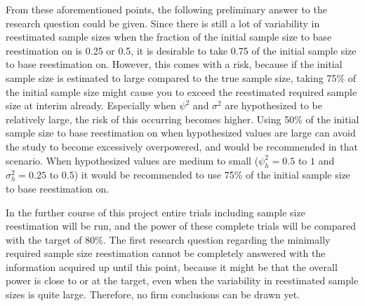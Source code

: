 \documentclass[11pt]{article}
\begin{document}
From these aforementioned points, the following preliminary answer to the research question could be given. Since there is still a lot of variability in reestimated sample sizes when the fraction of the initial sample size to base reestimation on is 0.25 or 0.5, it is desirable to take 0.75 of the initial sample size to base reestimation on. However, this comes with a risk, because if the initial sample size is estimated to large compared to the true sample size, taking 75\% of the initial sample size might cause you to exceed the reestimated required sample size at interim already. Especially when $\psi^2$ and $\sigma^2$ are hypothesized to be relatively large, the risk of this occurring becomes higher. Using 50\% of the initial sample size to base reestimation on when hypothesized values are large can avoid the study to become excessively overpowered, and would be recommended in that scenario. When hypothesized values are medium to small ($\psi_h^2 = 0.5$ to $1$ and $\sigma_h^2 = 0.25$ to $0.5$) it would be recommended to use 75\% of the initial sample size to base reestimation on. 

In the further course of this project entire trials including sample size reestimation will be run, and the power of these complete trials will be compared with the target of 80\%. The first research question regarding the minimally required sample size reestimation cannot be completely answered with the information acquired up until this point, because it might be that the overall power is close to or at the target, even when the variability in reestimated sample sizes is quite large. Therefore, no firm conclusions can be drawn yet. 

\newpage
\thispagestyle{empty}
\end{document}
